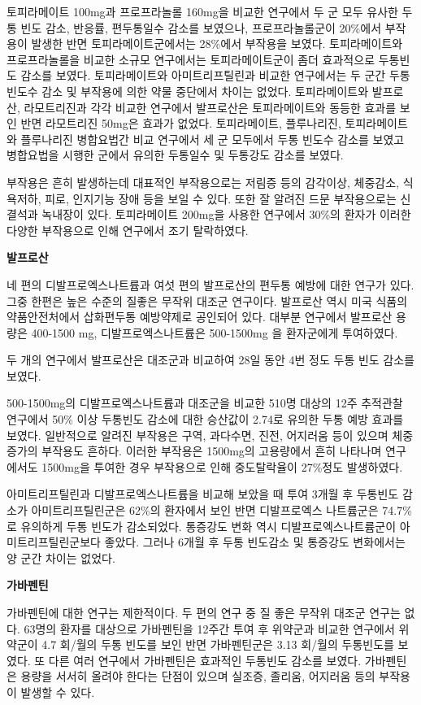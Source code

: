 \documentclass[]{book}
\begin{document}
토피라메이트 100mg과 프로프라놀롤 160mg을 비교한 연구에서 두 군 모두 유사한 두통 빈도 감소, 반응률, 편두통일수 감소를 보였으나, 프로프라놀롤군이 20\%에서 부작용이 발생한 반면 토피라메이트군에서는 28\%에서 부작용을 보였다. 토피라메이트와 프로프라놀롤을 비교한 소규모 연구에서는 토피라메이트군이 좀더 효과적으로 두통빈도 감소를 보였다. 토피라메이트와 아미트리프틸린과 비교한 연구에서는 두 군간 두통 빈도수 감소 및 부작용에 의한 약물 중단에서 차이는 없었다. 토피라메이트와 발프로산, 라모트리진과 각각 비교한 연구에서 발프로산은 토피라메이트와 동등한 효과를 보인 반면 라모트리진 50mg은 효과가 없었다. 토피라메이트, 플루나리진, 토피라메이트와 플루나리진 병합요법간 비교 연구에서 세 군 모두에서 두통 빈도수 감소를 보였고 병합요법을 시행한 군에서 유의한 두통일수 및 두통강도 감소를 보였다.

부작용은 흔히 발생하는데 대표적인 부작용으로는 저림증 등의 감각이상, 체중감소, 식욕저하, 피로, 인지기능 장애 등을 보일 수 있다. 또한 잘 알려진 드문 부작용으로는 신결석과 녹내장이 있다. 토피라메이트 200mg을 사용한 연구에서 30\%의 환자가 이러한 다양한 부작용으로 인해 연구에서 조기 탈락하였다.

\textbf{발프로산}

네 편의 디발프로엑스나트륨과 여섯 편의 발프로산의 편두통 예방에 대한 연구가 있다. 그중 한편은 높은 수준의 질좋은 무작위 대조군 연구이다. 발프로산 역시 미국 식품의약품안전처에서 삽화편두통 예방약제로 공인되어 있다. 대부분 연구에서 발프로산 용량은 400-1500 mg, 디발프로엑스나트륨은 500-1500mg 을 환자군에게 투여하였다.

두 개의 연구에서 발프로산은 대조군과 비교하여 28일 동안 4번 정도 두통 빈도 감소를 보였다.

500-1500mg의 디발프로엑스나트륨과 대조군을 비교한 510명 대상의 12주 추적관찰 연구에서 50\% 이상 두통빈도 감소에 대한 승산값이 2.74로 유의한 두통 예방 효과를 보였다. 일반적으로 알려진 부작용은 구역, 과다수면, 진전, 어지러움 등이 있으며 체중 증가의 부작용도 흔하다. 이러한 부작용은 1500mg의 고용량에서 흔히 나타나며 연구에서도 1500mg을 투여한 경우 부작용으로 인해 중도탈락율이 27\%정도 발생하였다.

아미트리프틸린과 디발프로엑스나트륨을 비교해 보았을 때 투여 3개월 후 두통빈도 감소가 아미트리프틸린군은 62\%의 환자에서 보인 반면 디발프로엑스 나트륨군은 74.7\%로 유의하게 두통 빈도가 감소되었다. 통증강도 변화 역시 디발프로엑스나트륨군이 아미트리프틸린군보다 좋았다. 그러나 6개월 후 두통 빈도감소 및 통증강도 변화에서는 양 군간 차이는 없었다.

\textbf{가바펜틴}

가바펜틴에 대한 연구는 제한적이다. 두 편의 연구 중 질 좋은 무작위 대조군 연구는 없다. 63명의 환자를 대상으로 가바펜틴을 12주간 투여 후 위약군과 비교한 연구에서 위약군이 4.7 회/월의 두통 빈도를 보인 반면 가바펜틴군은 3.13 회/월의 두통빈도를 보였다. 또 다른 여러 연구에서 가바펜틴은 효과적인 두통빈도 감소를 보였다. 가바펜틴은 용량을 서서히 올려야 한다는 단점이 있으며 실조증, 졸리움, 어지러움 등의 부작용이 발생할 수 있다.
\end{document}
